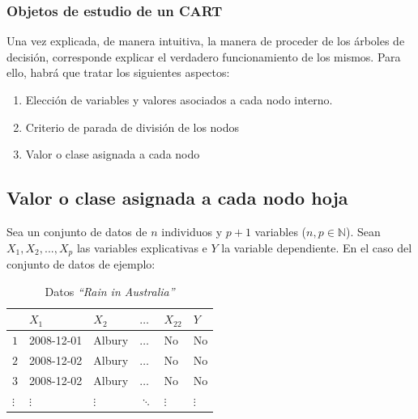 \documentclass[12pt,twoside]{article}
\begin{document}
\subsubsection{Objetos de estudio de un CART}

Una vez explicada, de manera intuitiva, la manera de proceder de los árboles de decisión, corresponde explicar el verdadero funcionamiento de los mismos. Para ello, habrá que tratar los siguientes aspectos:
\begin{enumerate}
\item Elección de variables y valores asociados a cada nodo interno.
\item Criterio de parada de división de los nodos
\item Valor o clase asignada a cada nodo
\end{enumerate}



\subsection{Valor o clase asignada a cada nodo hoja} \label{sec:2.4}
Sea un conjunto de datos de $n$ individuos y $p+1$ variables ($n,p \in \mathbb{N}$). Sean $X_1, X_2, ... , X_p$ las variables explicativas e $Y$ la variable dependiente. En el caso del conjunto de datos de ejemplo:
\begin{table}[h]
\centering
\begin{tabular}{l|l|l|l|l|l|}
\cline{2-6}
                                                       & \cellcolor[HTML]{C0C0C0}$X_1$ & \cellcolor[HTML]{C0C0C0}$X_2$ & \cellcolor[HTML]{C0C0C0}$\dots$ & \cellcolor[HTML]{C0C0C0}$X_{22}$ & \cellcolor[HTML]{9B9B9B}$Y$ \\ \hline
\multicolumn{1}{|l|}{\cellcolor[HTML]{C0C0C0}$1$}    & 2008-12-01                    & Albury                        & $\dots$                         & No                               & No                          \\ \hline
\multicolumn{1}{|l|}{\cellcolor[HTML]{C0C0C0}$2$}    & 2008-12-02                    & Albury                        & $\dots$                         & No                               & No                          \\ \hline
\multicolumn{1}{|l|}{\cellcolor[HTML]{C0C0C0}$3$}     & 2008-12-02                    & Albury                        & $\dots$                         & No                               & No                          \\ \hline
\multicolumn{1}{|l|}{\cellcolor[HTML]{C0C0C0}$\vdots$} & $\vdots$                      & $\vdots$                      & $\ddots$                        & $\vdots$                         & $\vdots$                    \\ \hline
\end{tabular}
\caption{Datos \textit{``Rain in Australia''}}
\label{tab:Datos}
\end{table}
\end{document}
